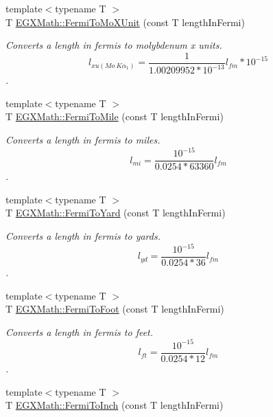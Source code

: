 \begin{DoxyCompactItemize}
{\footnotesize template$<$typename T $>$ }\\T \mbox{\hyperlink{group___e_g_x_math-_conversions-_length_conversions-_non-_s_i-_fermi-_non-_s_i_ga8555a46e14c4a759e0b04a54485d679e}{E\+G\+X\+Math\+::\+Fermi\+To\+Mo\+X\+Unit}} (const T length\+In\+Fermi)
\begin{DoxyCompactList}\small\item\em Converts a length in fermis to molybdenum x units. \[ l_{xu(Mo\ K\alpha_1)}=\frac{1}{1.00209952*10^{-13}} l_{fm} * 10^{-15}\]. \end{DoxyCompactList}\item 
{\footnotesize template$<$typename T $>$ }\\T \mbox{\hyperlink{group___e_g_x_math-_conversions-_length_conversions-_non-_s_i-_fermi-_imperial_gaf74233f6bd05bd9a63a486813d3b4bf8}{E\+G\+X\+Math\+::\+Fermi\+To\+Mile}} (const T length\+In\+Fermi)
\begin{DoxyCompactList}\small\item\em Converts a length in fermis to miles. \[ l_{mi}=\frac{10^{-15}}{0.0254 * 63360} l_{fm} \]. \end{DoxyCompactList}\item 
{\footnotesize template$<$typename T $>$ }\\T \mbox{\hyperlink{group___e_g_x_math-_conversions-_length_conversions-_non-_s_i-_fermi-_imperial_ga5dce34089b9de102570c5c9c68b58176}{E\+G\+X\+Math\+::\+Fermi\+To\+Yard}} (const T length\+In\+Fermi)
\begin{DoxyCompactList}\small\item\em Converts a length in fermis to yards. \[ l_{yd}= \frac{10^{-15}}{0.0254 * 36} l_{fm} \]. \end{DoxyCompactList}\item 
{\footnotesize template$<$typename T $>$ }\\T \mbox{\hyperlink{group___e_g_x_math-_conversions-_length_conversions-_non-_s_i-_fermi-_imperial_ga22e9d7b13f45ef14c3963254caff7d78}{E\+G\+X\+Math\+::\+Fermi\+To\+Foot}} (const T length\+In\+Fermi)
\begin{DoxyCompactList}\small\item\em Converts a length in fermis to feet. \[ l_{ft}= \frac{10^{-15}}{0.0254 * 12} l_{fm} \]. \end{DoxyCompactList}\item 
{\footnotesize template$<$typename T $>$ }\\T \mbox{\hyperlink{group___e_g_x_math-_conversions-_length_conversions-_non-_s_i-_fermi-_imperial_gaacac85ebc839bc27889740d9ae608259}{E\+G\+X\+Math\+::\+Fermi\+To\+Inch}} (const T length\+In\+Fermi)

\end{DoxyCompactItemize}
